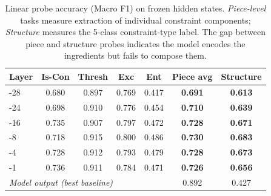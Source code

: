 \begin{table}[t]
\centering
\small
\caption{Linear probe accuracy (Macro F1) on frozen hidden states. \textit{Piece-level} tasks measure extraction of individual constraint components; \textit{Structure} measures the 5-class constraint-type label. The gap between piece and structure probes indicates the model encodes the ingredients but fails to compose them.}
\label{tab:linear_probe}
\begin{tabular}{l|cccc|c|c}
\toprule
Layer & Is-Con & Thresh & Exc & Ent & \textbf{Piece avg} & \textbf{Structure} \\
\midrule
  -28 & 0.680 & 0.897 & 0.769 & 0.417 & \textbf{0.691} & \textbf{0.613} \\
  -24 & 0.698 & 0.910 & 0.776 & 0.454 & \textbf{0.710} & \textbf{0.639} \\
  -16 & 0.735 & 0.907 & 0.797 & 0.472 & \textbf{0.728} & \textbf{0.671} \\
  -8 & 0.718 & 0.915 & 0.800 & 0.486 & \textbf{0.730} & \textbf{0.683} \\
  -4 & 0.728 & 0.912 & 0.793 & 0.479 & \textbf{0.728} & \textbf{0.673} \\
  -1 & 0.736 & 0.911 & 0.784 & 0.471 & \textbf{0.726} & \textbf{0.656} \\
\midrule
\multicolumn{5}{l|}{\textit{Model output (best baseline)}}
& 0.892 & 0.427 \\
\bottomrule
\end{tabular}
\end{table}